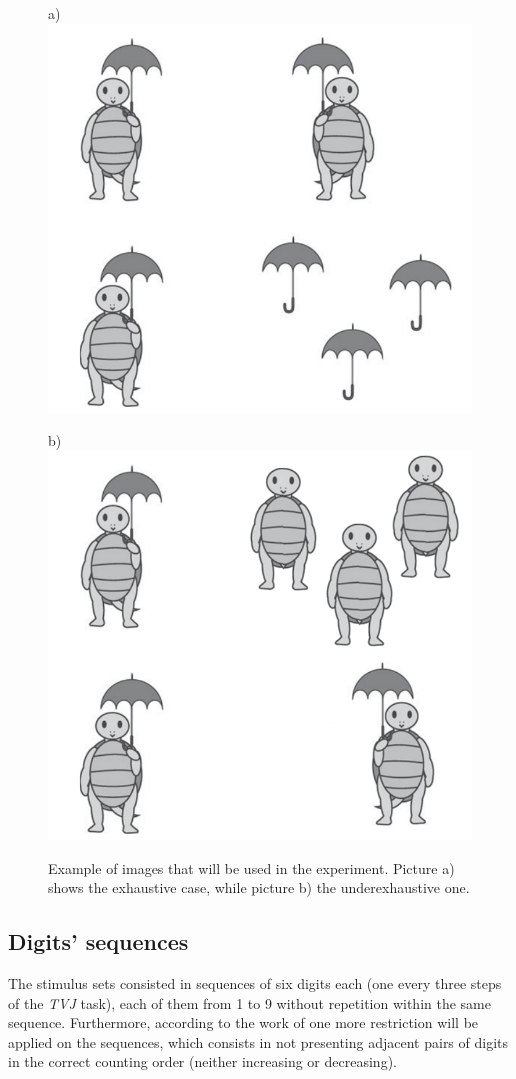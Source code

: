 \documentclass[10pt, a4]{article}
\begin{document}
\begin{figure} [!ht]
    \begin{minipage}{0.48\textwidth}
      a)
      \centering
      \includegraphics[width=.7\linewidth]{proj_prop_turtles_exhaustive.png}
      \label{img-target-exhaustive}    
    \end{minipage}
    \begin {minipage}{0.48\textwidth}
      b)
      \centering
      \includegraphics[width=.7\linewidth]{proj_prop_turtles_underexhaustive.png}
      \label{img-target-underexhaustive}
    \end{minipage}
    \caption{Example of images that will be used in the experiment. Picture a) shows the exhaustive case, while picture b) the underexhaustive one.}
    \label{img-target-sample}
\end{figure}


\subsection{Digits' sequences}
The stimulus sets consisted in sequences of six digits each (one every three steps of the \textit{TVJ} task), each of them from 1 to 9 without
repetition within the same sequence. Furthermore, according to the work of \cite{taub1972comparison} one more restriction will be applied on the sequences,
which consists in not presenting adjacent pairs of digits in the correct counting order (neither increasing or decreasing).\\
\end{document}
